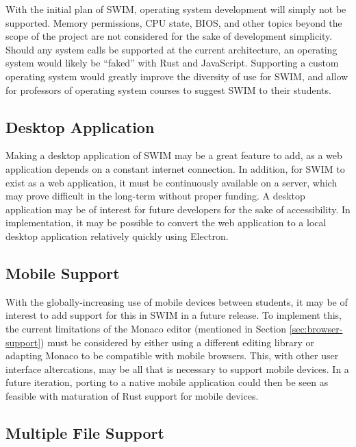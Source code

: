 \documentclass[
    paper=letter,
    parskip=half,
    fontsize=12pt,
    titlepage=firstiscover,
    toc=bibliography,
    numbers=endperiod
]{scrartcl}
\begin{document}
With the initial plan of SWIM, operating system development will simply
not be supported. Memory permissions, CPU state, BIOS, and other topics
beyond the scope of the project are not considered for the sake of
development simplicity. Should any system calls be supported at the
current architecture, an operating system would likely be ``faked'' with
Rust and JavaScript. Supporting a custom operating system would greatly
improve the diversity of use for SWIM, and allow for professors of
operating system courses to suggest SWIM to their students.


\subsection{Desktop Application}

Making a desktop application of SWIM may be a great feature to add, as a
web application depends on a constant internet connection. In addition,
for SWIM to exist as a web application, it must be continuously
available on a server, which may prove difficult in the long-term
without proper funding. A desktop application may be of interest for
future developers for the sake of accessibility. In implementation, it
may be possible to convert the web application to a local desktop
application relatively quickly using Electron.

\subsection{Mobile Support}

With the globally-increasing use of mobile devices between students, it
may be of interest to add support for this in SWIM in a future release.
To implement this, the current limitations of the Monaco editor
(mentioned in Section \ref{sec:browser-support}) must be considered by
either using a different editing library or adapting Monaco to be
compatible with mobile browsers. This, with other user interface
altercations, may be all that is necessary to support mobile devices. In
a future iteration, porting to a native mobile application could then be
seen as feasible with maturation of Rust support for mobile devices.

\subsection{Multiple File Support}
\end{document}
